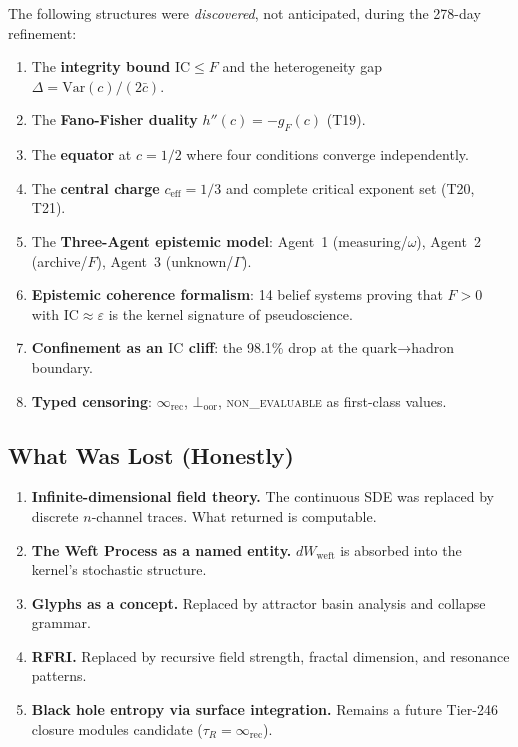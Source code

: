 \documentclass[
  aps,
  prd,
  preprint,
  superscriptaddress,
  nofootinbib,
  floatfix,
  longbibliography
]{revtex4-2}
\newcommand{\tR}{\tau_{\!R}}
\newcommand{\Gam}{\Gamma}
\newcommand{\eps}{\varepsilon}
\newcommand{\regime}[1]{\textrm{\upshape\scshape#1}}
\newcommand{\IC}{\mathrm{IC}}
\newcommand{\Fid}{F}
\newcommand{\Drft}{\omega}
\newcommand{\ceff}{c_{\mathrm{eff}}}
\newcommand{\gFisher}{g_{\!F}}
\newcommand{\hetgap}{\Delta}
\begin{document}
The following structures were \emph{discovered}, not anticipated,
during the 278-day refinement:
\begin{enumerate}[nosep,leftmargin=*]
  \item The \textbf{integrity bound} $\IC \leq \Fid$ and the
    heterogeneity gap $\hetgap = \mathrm{Var}(c)/(2\bar{c})$.
  \item The \textbf{Fano-Fisher duality} $h''(c) = -\gFisher(c)$
    (T19).
  \item The \textbf{equator} at $c = 1/2$ where four conditions
    converge independently.
  \item The \textbf{central charge} $\ceff = 1/3$ and complete
    critical exponent set (T20, T21).
  \item The \textbf{Three-Agent epistemic model}:
    Agent~1 (measuring/$\Drft$), Agent~2 (archive/$\Fid$),
    Agent~3 (unknown/$\Gam$).
  \item \textbf{Epistemic coherence formalism}: 14 belief systems
    proving that $\Fid > 0$ with $\IC \approx \eps$ is the
    kernel signature of pseudoscience.
  \item \textbf{Confinement as an $\IC$ cliff}: the 98.1\% drop
    at the quark→hadron boundary.
  \item \textbf{Typed censoring}: $\infty_{\mathrm{rec}}$,
    $\bot_{\mathrm{oor}}$, \regime{non\_evaluable}
    as first-class values.
\end{enumerate}

\subsection{What Was Lost (Honestly)}

\begin{enumerate}[nosep,leftmargin=*]
  \item \textbf{Infinite-dimensional field theory.}
    The continuous SDE was replaced by discrete $n$-channel
    traces. What returned is computable.
  \item \textbf{The Weft Process as a named entity.}
    $dW_{\mathrm{weft}}$ is absorbed into the kernel's
    stochastic structure.
  \item \textbf{Glyphs as a concept.} Replaced by attractor
    basin analysis and collapse grammar.
  \item \textbf{RFRI.} Replaced by recursive field strength,
    fractal dimension, and resonance patterns.
  \item \textbf{Black hole entropy via surface integration.}
    Remains a future Tier-246 closure modules candidate
    ($\tR = \infty_{\mathrm{rec}}$).
\end{enumerate}
\end{document}
